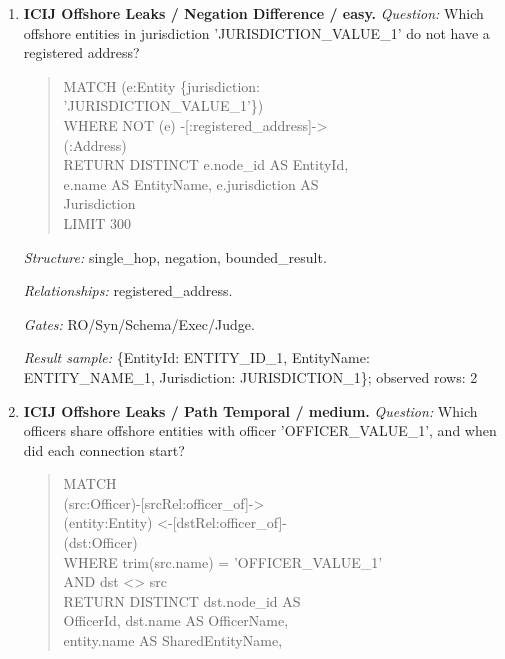 \begin{enumerate}
\textit{Relationships:} registered\_address.\par
\textit{Gates:} RO/Syn/Schema/Exec/Judge.\par
\textit{Result sample:} \{OfficerId: OFFICER\_ID\_1, OfficerName: OFFICER\_NAME\_1, RegisteredAddress: ADDRESS\_1\}; observed rows: 8
\item \textbf{ICIJ Offshore Leaks / Negation Difference / easy.}
\textit{Question:} Which offshore entities in jurisdiction 'JURISDICTION\_VALUE\_1' do not have a registered address?
\begin{quote}\scriptsize\ttfamily\raggedright\sloppy
MATCH (e:Entity \{jurisdiction:\\
'JURISDICTION\_VALUE\_1'\})\\
WHERE NOT (e) -[:registered\_address]-\textgreater{}\\
(:Address)\\
RETURN DISTINCT e.node\_id AS EntityId,\\
e.name AS EntityName, e.jurisdiction AS\\
Jurisdiction\\
LIMIT 300
\end{quote}
\textit{Structure:} single\_hop, negation, bounded\_result.\par
\textit{Relationships:} registered\_address.\par
\textit{Gates:} RO/Syn/Schema/Exec/Judge.\par
\textit{Result sample:} \{EntityId: ENTITY\_ID\_1, EntityName: ENTITY\_NAME\_1, Jurisdiction: JURISDICTION\_1\}; observed rows: 2
\item \textbf{ICIJ Offshore Leaks / Path Temporal / medium.}
\textit{Question:} Which officers share offshore entities with officer 'OFFICER\_VALUE\_1', and when did each connection start?
\begin{quote}\scriptsize\ttfamily\raggedright\sloppy
MATCH\\
(src:Officer)-[srcRel:officer\_of]-\textgreater{}\\
(entity:Entity) \textless{}-[dstRel:officer\_of]-\\
(dst:Officer)\\
WHERE trim(src.name) = 'OFFICER\_VALUE\_1'\\
AND dst \textless{}\textgreater{} src\\
RETURN DISTINCT dst.node\_id AS\\
OfficerId, dst.name AS OfficerName,\\
entity.name AS SharedEntityName,\\

\end{quote}
\end{enumerate}

